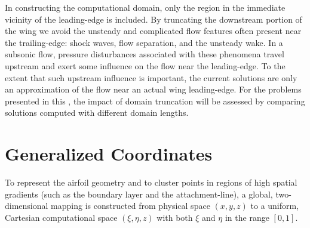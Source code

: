 In constructing the computational domain, only the region in the immediate
vicinity of the leading-edge is included.  By truncating the downstream
portion of the wing we avoid the unsteady and complicated flow features often
present near the trailing-edge: shock waves, flow separation, and the unsteady
wake.  In a subsonic flow, pressure disturbances associated with these
phenomena travel upstream and exert some influence on the flow near the
leading-edge.  To the extent that such upstream influence is important, the
current solutions are only an approximation of the flow near an actual wing
leading-edge.  For the problems presented in this \thesis, the impact of
domain truncation will be assessed by comparing solutions computed with
different domain lengths.

\section{Generalized Coordinates \label{s:gencoord} }

To represent the airfoil geometry and to cluster points in regions of high
spatial gradients (such as the boundary layer and the attachment-line), a
global, two-dimensional mapping is constructed from physical space $(x,y,z)$
to a uniform, Cartesian computational space $(\xi,\eta,z)$ with both $\xi$ and
$\eta$ in the range $[0,1]$.

